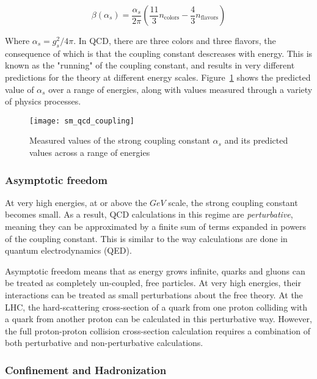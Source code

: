 \begin{equation}\label{eq:sm_qcd_beta}
    \beta\left(\alpha_s\right) = \frac{\alpha_s}{2\pi}\left(\frac{11}{3}n_{\text{colors}}-\frac{4}{3}n_{\text{flavors}}\right)
\end{equation}

Where $\alpha_s = g_s^2 / 4\pi$.
In QCD, there are three colors and three flavors, the consequence of which is that the coupling constant descreases with energy.
This is known as the "running" of the coupling constant, and results in very different predictions for the theory at different energy scales.
Figure~\ref{fig:sm_qcd_coupling} shows the predicted value of $\alpha_s$ over a range of energies,
along with values measured through a variety of physics processes.

\begin{figure}[!ht]
    \centering
\texttt{[image: sm\_qcd\_coupling]}
\caption{Measured values of the strong coupling constant $\alpha_s$ and its predicted values across a range of energies}
\label{fig:sm_qcd_coupling}
\end{figure}\cite{sm-review-2014}

\subsubsection{Asymptotic freedom}

At very high energies, at or above the $GeV$ scale, the strong coupling constant becomes small.
As a result, QCD calculations in this regime are \textit{perturbative},
meaning they can be approximated by a finite sum of terms expanded in powers of the coupling constant.
This is similar to the way calculations are done in quantum electrodynamics (QED).

Asymptotic freedom means that as energy grows infinite,
quarks and gluons can be treated as completely un-coupled, free particles.
At very high energies, their interactions can be treated as small perturbations about the free theory.
At the LHC, the hard-scattering cross-section of a quark from one proton colliding with a quark from another proton
can be calculated in this perturbative way.
However, the full proton-proton collision cross-section calculation requires a combination of both perturbative and non-perturbative calculations.

\subsubsection{Confinement and Hadronization}

